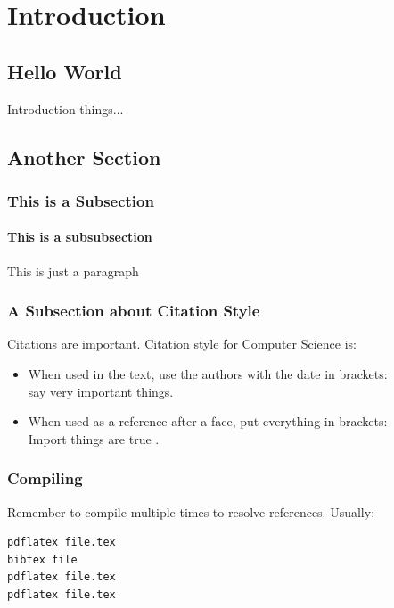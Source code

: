 \documentclass[a4paper,twoside,12pt]{report}
\begin{document}
{}
\tableofcontents
\newpage
{}
{}
\listoffigures
\newpage
{}
{}
\listoftables
\newpage
{}

\chapter{Introduction}
\section{Hello World}
Introduction things...\\
\section{Another Section}
\subsection{This is a Subsection}
\subsubsection{This is a subsubsection}
This is just a paragraph
\subsection{A Subsection about Citation Style}
Citations are important. Citation style for Computer Science is:
\begin{itemize}
\item When used in the text, use the authors with the date in brackets:\\ \citet{klein17} say very important things.
\item When used as a reference after a face, put everything in brackets:\\ Import things are true \citep{klein17}.
\end{itemize}

\subsection{Compiling}
Remember to compile multiple times to resolve references. Usually:
\begin{verbatim}
pdflatex file.tex
bibtex file
pdflatex file.tex
pdflatex file.tex
\end{verbatim}
\end{document}
